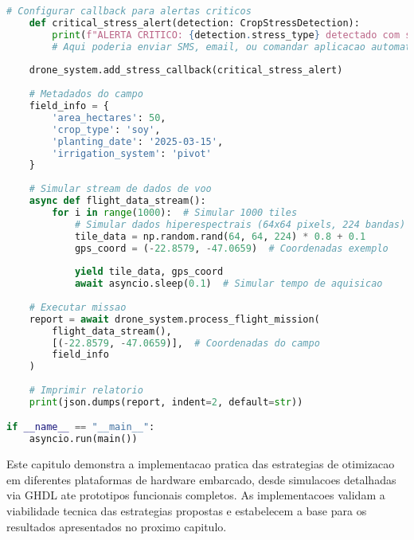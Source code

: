 \begin{lstlisting}[language=Python]
    # Configurar callback para alertas criticos
    def critical_stress_alert(detection: CropStressDetection):
        print(f"ALERTA CRITICO: {detection.stress_type} detectado com severidade {detection.severity:.2f}")
        # Aqui poderia enviar SMS, email, ou comandar aplicacao automatica
    
    drone_system.add_stress_callback(critical_stress_alert)
    
    # Metadados do campo
    field_info = {
        'area_hectares': 50,
        'crop_type': 'soy',
        'planting_date': '2025-03-15',
        'irrigation_system': 'pivot'
    }
    
    # Simular stream de dados de voo
    async def flight_data_stream():
        for i in range(1000):  # Simular 1000 tiles
            # Simular dados hiperespectrais (64x64 pixels, 224 bandas)
            tile_data = np.random.rand(64, 64, 224) * 0.8 + 0.1
            gps_coord = (-22.8579, -47.0659)  # Coordenadas exemplo
            
            yield tile_data, gps_coord
            await asyncio.sleep(0.1)  # Simular tempo de aquisicao
    
    # Executar missao
    report = await drone_system.process_flight_mission(
        flight_data_stream(),
        [(-22.8579, -47.0659)],  # Coordenadas do campo
        field_info
    )
    
    # Imprimir relatorio
    print(json.dumps(report, indent=2, default=str))

if __name__ == "__main__":
    asyncio.run(main())
\end{lstlisting}

Este capitulo demonstra a implementacao pratica das estrategias de otimizacao em diferentes plataformas de hardware embarcado, desde simulacoes detalhadas via GHDL ate prototipos funcionais completos. As implementacoes validam a viabilidade tecnica das estrategias propostas e estabelecem a base para os resultados apresentados no proximo capitulo. 